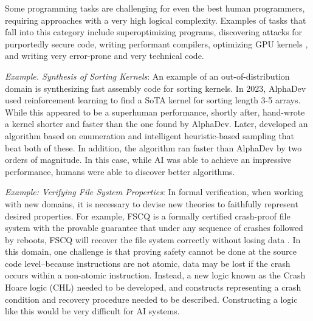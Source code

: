 Some programming tasks are challenging for even the best human programmers, requiring approaches with a very high logical complexity. Examples of tasks that fall into this category include superoptimizing programs, discovering attacks for purportedly secure code, writing performant compilers, optimizing GPU kernels \citep{ouyang2024kernelbench}, and writing very error-prone and very technical code. 



\begin{tcolorbox}[colback=lightblue, boxrule=0pt, arc=5pt, outer arc=5pt, after skip=10pt plus 2pt]
\textit{Example. Synthesis of Sorting Kernels}: An example of an out-of-distribution domain is synthesizing fast assembly code for sorting kernels. In 2023, AlphaDev \citep{mankowitz2023faster} used reinforcement learning to find a SoTA kernel for sorting length 3-5 arrays. While this appeared to be a superhuman performance, shortly after, \cite{neri2023shorter} hand-wrote a kernel shorter and faster than the one found by AlphaDev. Later, \citep{ullrich2024synthesis} developed an algorithm based on enumeration and intelligent heuristic-based sampling that beat both of these. In addition, the algorithm ran faster than AlphaDev by two orders of magnitude. In this case, while AI was able to achieve an impressive performance, humans were able to discover better algorithms.
\end{tcolorbox}

\begin{tcolorbox}[colback=lightblue, boxrule=0pt, arc=5pt, outer arc=5pt, after skip=10pt plus 2pt]
\textit{Example: Verifying File System Properties}: In formal verification, when working with new domains, it is necessary to devise new theories to faithfully represent desired properties. For example, FSCQ is a formally certified crash-proof file system with the provable guarantee that under any sequence of crashes followed by reboots, FSCQ will recover the file system correctly without losing data \citep{chen2015using}. In this domain, one challenge is that proving safety cannot be done at the source code level--because instructions are not atomic, data may be lost if the crash occurs within a non-atomic instruction. Instead, a new logic known as the Crash Hoare logic (CHL) needed to be developed, and constructs representing a crash condition and recovery procedure needed to be described. Constructing a logic like this would be very difficult for AI systems.
\end{tcolorbox}

